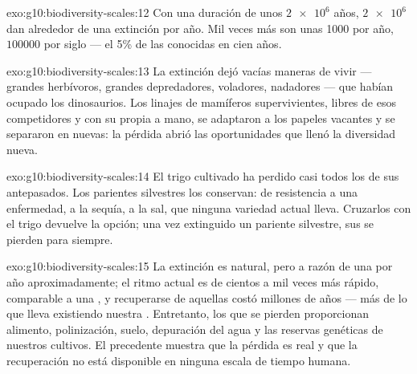 \begin{solution}{exo:g10:biodiversity-scales:12}
Con una duración de unos $\num{2e6}$ años, $\num{2e6}$  dan
alrededor de una extinción por año. Mil veces más son unas 1000
 por año, $\num{100000}$ por siglo --- el 5\% de las 
conocidas en cien años.
\end{solution}

\begin{solution}{exo:g10:biodiversity-scales:13}
La extinción dejó vacías maneras de vivir --- grandes herbívoros,
grandes depredadores, voladores, nadadores --- que habían ocupado los
dinosaurios. Los linajes de mamíferos supervivientes, libres de esos
competidores y con su propia  a mano, se adaptaron a
los papeles vacantes y se separaron en  nuevas: la pérdida
abrió las oportunidades que llenó la diversidad nueva.
\end{solution}

\begin{solution}{exo:g10:biodiversity-scales:14}
El trigo cultivado ha perdido casi todos los  de sus antepasados.
Los parientes silvestres los conservan:  de resistencia a una
enfermedad, a la sequía, a la sal, que ninguna variedad actual lleva.
Cruzarlos con el trigo devuelve la opción; una vez extinguido un
pariente silvestre, sus  se pierden para siempre.
\end{solution}

\begin{solution}{exo:g10:biodiversity-scales:15}
La extinción es natural, pero a razón de una  por año
aproximadamente; el ritmo actual es de cientos a mil veces más rápido,
comparable a una , y recuperarse de aquellas costó
millones de años --- más de lo que lleva existiendo nuestra .
Entretanto, los  que se pierden proporcionan alimento,
polinización, suelo, depuración del agua y las reservas genéticas de
nuestros cultivos. El precedente muestra que la pérdida es real y que
la recuperación no está disponible en ninguna escala de tiempo humana.
\end{solution}


